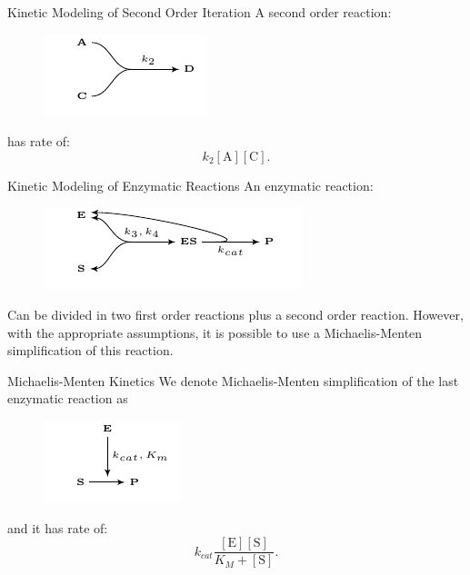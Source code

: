 \documentclass{beamer}
\begin{document}
\begin{frame}{Kinetic Modeling of Second Order Iteration}
A second order reaction:
\begin{figure}
\includegraphics[scale=1.5]{fundamental_concepts/second_order_reaction.pdf}
\end{figure}
\pause
has rate of:
\begin{equation*}
    k_2[\text{A}][\text{C}].
\end{equation*}
\end{frame}


\begin{frame}{Kinetic Modeling of Enzymatic Reactions}
An enzymatic reaction:
\begin{figure}
\includegraphics[scale=1.5]{fundamental_concepts/enzymatic_reaction.pdf}
\end{figure}
\pause
Can be divided in two first order reactions plus a second order 
reaction.
\pause
However, with the appropriate assumptions, it is possible to use a 
Michaelis-Menten simplification of this reaction.
\end{frame}


\begin{frame}{Michaelis-Menten Kinetics}
We denote Michaelis-Menten simplification of the last enzymatic reaction
as
\begin{figure}
\includegraphics[scale=1.5]{fundamental_concepts/michaelis_menten_reaction.pdf}
\end{figure}
\pause
and it has rate of:
\begin{equation*}
    k_{cat} \frac{[\text{E}][\text{S}]}{K_M + [\text{S}]}.
\end{equation*}
\end{frame}
\end{document}

